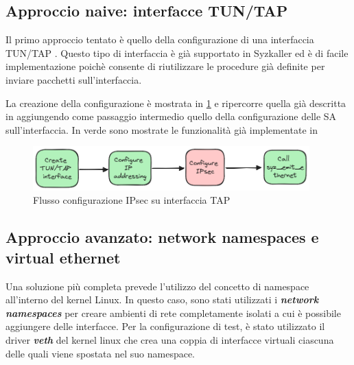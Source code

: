 \documentclass{article}
\begin{document}
\subsection{Approccio naive: interfacce TUN/TAP}
Il primo approccio tentato è quello della configurazione di una interfaccia TUN/TAP
\cite{LinuxDocs}. 
Questo tipo di interfaccia è già supportato in Syzkaller ed è di facile implementazione 
poichè consente di riutilizzare le procedure già definite per inviare pacchetti sull'interfaccia. 

La creazione della configurazione è mostrata in \cref{fig:tap-ipsec} e ripercorre quella già descritta in \cite{SyzkallerExternalNetworking}
aggiungendo come passaggio intermedio quello della configurazione delle SA sull'interfaccia.
In verde sono mostrate le funzionalità già implementate in \cite{SyzkallerExternalNetworking}

\begin{figure}
  \begin{center}
    \includegraphics[width=0.95\textwidth]{figures/tap-ipsec.png}
  \end{center}
  \caption{Flusso configurazione IPsec su interfaccia TAP}\label{fig:tap-ipsec}
\end{figure}

\subsection{Approccio avanzato: network namespaces e virtual ethernet}
Una soluzione più completa prevede l'utilizzo del concetto di namespace all'interno del 
kernel Linux. In questo caso, sono stati utilizzati i \textbf{\textit{network namespaces}}
per creare ambienti di rete completamente isolati a cui è possibile aggiungere delle 
interfacce. 
Per la configurazione di test, è stato utilizzato il driver \textbf{\textit{veth}} del 
kernel linux che crea una coppia di interfacce virtuali ciascuna delle quali viene spostata 
nel suo namespace.
\end{document}
